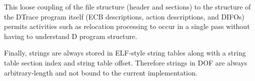This loose coupling of the file structure (header and sections) to the
structure of the DTrace program itself (ECB descriptions, action
descriptions, and DIFOs) permits activities such as relocation
processing to occur in a single pass without having to understand D
program structure.

Finally, strings are always stored in ELF-style string tables along
with a string table section index and string table offset.  Therefore
strings in DOF are always arbitrary-length and not bound to the
current implementation.


